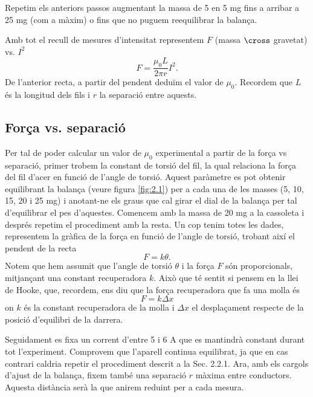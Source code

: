 \documentclass[a4paper,10.5pt]{report}
\begin{document}
Repetim els anteriors passos augmentant la massa de 5 en 5 mg fins a arribar a 25 mg (com a màxim) o fins que no puguem reequilibrar la balança.

Amb tot el recull de mesures d'intensitat representem $F$ (massa $\cross$ gravetat) vs. $I^2$
\begin{equation}
	F = \frac{\mu_0L}{2\pi r}I^2. \label{eq:2.9}
\end{equation}
De l'anterior recta, a partir del pendent deduïm el valor de $\mu_0$. Recordem que $L$ és la longitud dels fils i $r$ la separació entre aquests.

\subsection{Força vs. separació}
Per tal de poder calcular un valor de $\mu_0$ experimental a partir de la força vs separació, primer trobem la constant de torsió del fil, la qual relaciona la força del fil d'acer en funció de l'angle de torsió. Aquest paràmetre es pot obtenir equilibrant la balança (veure figura \ref{fig:2.1}) per a cada una de les masses (5, 10, 15, 20 i 25 mg) i anotant-ne els graus que cal girar el dial de la balança per tal d'equilibrar el pes d'aquestes. Comencem amb la massa de 20 mg a la cassoleta i després repetim el procediment amb la resta. Un cop tenim totes les dades, representem la gràfica de la força en funció de l'angle de torsió, trobant així el pendent de la recta 
\begin{equation}
	F=k\theta.
	\label{eq2:10}
\end{equation}
Notem que hem assumit que l'angle de torsió $\theta$ i la força $F$ són proporcionals, mitjançant una constant recuperadora $k$. Això que té sentit si pensem en la llei de Hooke, que, recordem, ens diu que la força recuperadora que fa una molla és
\begin{equation}
	F = k\Delta x
\end{equation} 
on $k$ és la constant recuperadora de la molla i $\Delta x$ el desplaçament respecte de la posició d'equilibri de la darrera.

Seguidament es fixa un corrent d'entre 5 i 6 A que es mantindrà constant durant tot l'experiment. Comprovem que l'aparell continua equilibrat, ja que en cas contrari caldria repetir el procediment descrit a la Sec. 2.2.1. Ara, amb els cargols d'ajust de la balança, fixem també una separació $r$ màxima entre conductors. Aquesta distància serà la que anirem reduint per a cada mesura.
\end{document}
